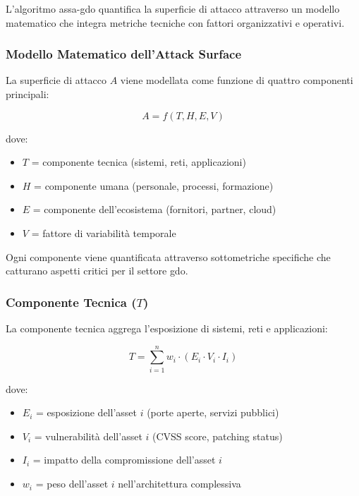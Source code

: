 L'algoritmo \gls{assa-gdo} quantifica la superficie di attacco attraverso un modello matematico che integra metriche tecniche con fattori organizzativi e operativi.

\subsubsection{Modello Matematico dell'Attack Surface}

La superficie di attacco $A$ viene modellata come funzione di quattro componenti principali:

\begin{equation}
A = f(T, H, E, V)
\end{equation}

dove:
\begin{itemize}
\item $T$ = componente tecnica (sistemi, reti, applicazioni)
\item $H$ = componente umana (personale, processi, formazione)
\item $E$ = componente dell'ecosistema (fornitori, partner, cloud)
\item $V$ = fattore di variabilità temporale
\end{itemize}

Ogni componente viene quantificata attraverso sottometriche specifiche che catturano aspetti critici per il settore \gls{gdo}.

\subsubsection{Componente Tecnica ($T$)}

La componente tecnica aggrega l'esposizione di sistemi, reti e applicazioni:

\begin{equation}
T = \sum_{i=1}^{n} w_i \cdot (E_i \cdot V_i \cdot I_i)
\end{equation}

dove:
\begin{itemize}
\item $E_i$ = esposizione dell'asset $i$ (porte aperte, servizi pubblici)
\item $V_i$ = vulnerabilità dell'asset $i$ (CVSS score, patching status)
\item $I_i$ = impatto della compromissione dell'asset $i$
\item $w_i$ = peso dell'asset $i$ nell'architettura complessiva
\end{itemize}

